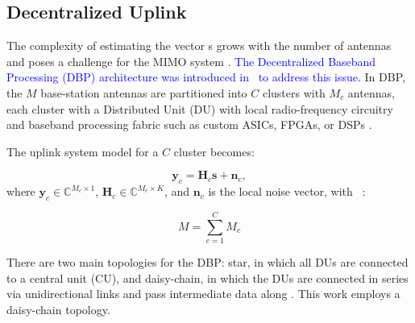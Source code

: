 \subsection{Decentralized Uplink}\label{subsec:dbp}

The complexity of estimating the vector s grows with the number of antennas and poses a challenge for the MIMO system \cite{jeon2019}. \textcolor{blue}{The Decentralized Baseband Processing (DBP) architecture was introduced in~\cite{decentralized2017, bertilsson2018distributed} to address this issue.} In DBP, the $M$ base-station antennas are partitioned into $C$ clusters with $M_c$ antennas, each cluster with a Distributed Unit (DU) with local radio-frequency circuitry and baseband processing fabric such as custom ASICs, FPGAs, or DSPs \cite{decentralized2017}. 

The uplink system model for a $C$ cluster becomes:

\begin{equation}
    \mathbf{y}_c = \mathbf{H}_c\mathbf{s} + \mathbf{n}_c,
\end{equation}
where $\mathbf{y}_c \in \mathbb{C}^{M_c \times 1}$,
$\mathbf{H}_c \in \mathbb{C}^{M_c \times K}$, and $\mathbf{n}_c$ is the
local noise vector, with ~\cite{jeon2019}:

\begin{equation}
M = \sum_{c=1}^{C} M_c    
\end{equation}

There are two main topologies for the DBP: star, in which all DUs are connected to a central unit (CU), and daisy-chain, in which the DUs are connected in series via unidirectional links and pass intermediate data along  \cite{rodriguezsanchez2020,zhao2025jsac}. This work employs a daisy-chain topology.
